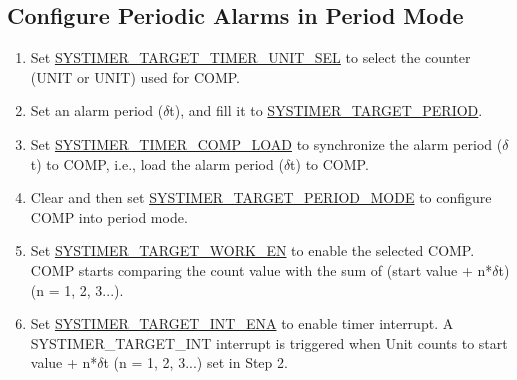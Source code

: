\documentclass[main\_\_EN.tex]{subfiles}
\begin{document}
\subsection{Configure Periodic Alarms in Period Mode}
\begin{enumerate}
    \item Set \hyperref[fielddesc:SYSTIMERTARGET0TIMERUNITSEL]{SYSTIMER\_TARGET\_TIMER\_UNIT\_SEL} to select the counter (UNIT or UNIT) used for COMP.
    \item Set an alarm period ($\delta$t), and fill it to \hyperref[fielddesc:SYSTIMERTARGET0PERIOD]{SYSTIMER\_TARGET\_PERIOD}.
    \item Set \hyperref[fielddesc:SYSTIMERTIMERCOMP0LOAD]{SYSTIMER\_TIMER\_COMP\_LOAD} to synchronize the alarm period ($\delta$t) to COMP, i.e., load the alarm period ($\delta$t) to COMP.
    \item Clear and then set \hyperref[fielddesc:SYSTIMERTARGET0PERIODMODE]{SYSTIMER\_TARGET\_PERIOD\_MODE} to configure COMP into period mode.
    \item Set \hyperref[fielddesc:SYSTIMERTARGET0WORKEN]{SYSTIMER\_TARGET\_WORK\_EN} to enable the selected COMP. COMP starts comparing the count value with the sum of (start value + n*$\delta$t) (n = 1, 2, 3...).
    \item Set \hyperref[fielddesc:SYSTIMERTARGET0INTENA]{SYSTIMER\_TARGET\_INT\_ENA} to enable timer interrupt. A SYSTIMER\_TARGET\_INT interrupt is triggered when Unit counts to start value + n*$\delta$t (n = 1, 2, 3...) set in Step 2.
\end{enumerate}
\end{document}
